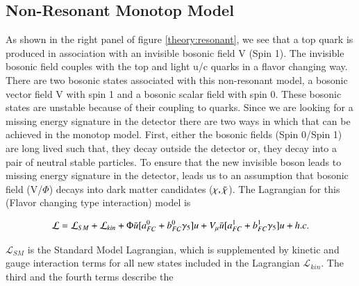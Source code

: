 \subsection{Non-Resonant Monotop Model}
As shown in the right panel of figure \ref{theory:resonant}, we see that a top quark is produced in association with an invisible bosonic field V (Spin 1). The invisible bosonic field couples with the top and light u/c quarks in a flavor changing way. There are two bosonic states associated with this non-resonant model, a bosonic vector field V with spin 1 and a bosonic scalar field with spin 0. These bosonic states are unstable because of their coupling to quarks. Since we are looking for a missing energy signature in the detector there are two ways in which that can be achieved in the monotop model. First, either the bosonic fields (Spin 0/Spin 1) are long lived such that, they decay outside the detector or, they decay into a pair of neutral stable particles. To ensure that the new invisible boson leads to missing energy signature in the detector, leads us to an assumption that bosonic field (V/$\Phi$) decays into dark matter candidates ($\chi, \Bar{\chi}$). The Lagrangian \cite{monotoptheory:2} for this (Flavor changing type interaction) model is 

\begingroup
\large
\begin{equation}
\mathcal{L} = \mathcal{L}_{SM} + \mathcal{L}_{kin} + 
\Phi\Bar{u}[a^{0}_{FC} + b^{0}_{FC}\gamma_{5}]u + V_{\mu}\Bar{u}[a^{1}_{FC} + b^{1}_{FC}\gamma_{5}]u + h.c.
  \label{eq:lagrangian_monotop}
\end{equation}
\endgroup

$\mathcal{L}_{SM}$ is the Standard Model Lagrangian, which is supplemented by kinetic and gauge interaction terms for all new states included in the Lagrangian $\mathcal{L}_{kin}$. The third and the fourth terms describe the